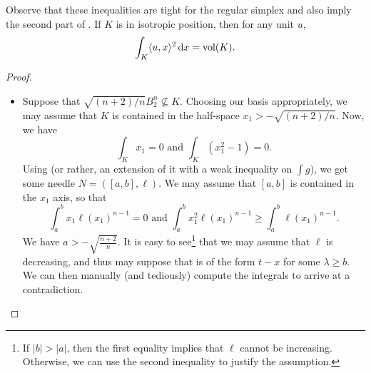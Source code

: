 		Observe that these inequalities are tight for the regular simplex and also imply the second part of . If $K$ is in isotropic position, then for any unit $u$,
		\[ \int_K \langle u,x\rangle^2 \operatorname{d}\!{x} = \operatorname{vol}(K). \]

		\begin{proof}
			\phantom{agh}
			\begin{itemize}
				\item Suppose that $\sqrt{(n+2)/n}B_2^n\not\subseteq K$. Choosing our basis appropriately, we may assume that $K$ is contained in the half-space $x_1 > -\sqrt{(n+2)/n}$. Now, we have
				\[ \int_K x_1 = 0 \text{ and } \int_K (x_1^2 - 1) = 0. \]
				Using  (or rather, an extension of it with a weak inequality on $\int g$), we get some needle $N=([a,b],\ell)$. We may assume that $[a,b]$ is contained in the $x_1$ axis, so that
				\[ \int_a^b x_1\ell(x_1)^{n-1} = 0 \text{ and } \int_a^b x_1^2\ell(x_1)^{n-1} \geq \int_a^b \ell(x_1)^{n-1}. \]
				We have $a > -\sqrt{\frac{n+2}{n}}$. It is easy to see\footnote{If $|b|>|a|$, then the first equality implies that $\ell$ cannot be increasing. Otherwise, we can use the second inequality to justify the assumption.} that we may assume that $\ell$ is decreasing, and thus may suppose that is of the form $t-x$ for some $\lambda\geq b$. We can then manually (and tediously) compute the integrals to arrive at a contradiction.


\end{itemize}
\end{proof}
